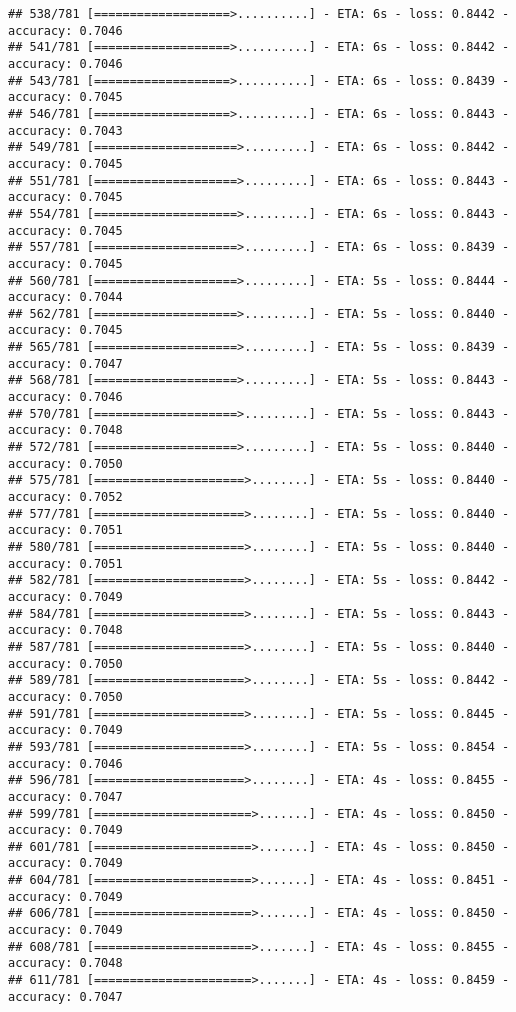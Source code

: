 \documentclass[
]{article}
\begin{document}
\begin{verbatim}
## 538/781 [===================>..........] - ETA: 6s - loss: 0.8442 - accuracy: 0.7046
## 541/781 [===================>..........] - ETA: 6s - loss: 0.8442 - accuracy: 0.7046
## 543/781 [===================>..........] - ETA: 6s - loss: 0.8439 - accuracy: 0.7045
## 546/781 [===================>..........] - ETA: 6s - loss: 0.8443 - accuracy: 0.7043
## 549/781 [====================>.........] - ETA: 6s - loss: 0.8442 - accuracy: 0.7045
## 551/781 [====================>.........] - ETA: 6s - loss: 0.8443 - accuracy: 0.7045
## 554/781 [====================>.........] - ETA: 6s - loss: 0.8443 - accuracy: 0.7045
## 557/781 [====================>.........] - ETA: 6s - loss: 0.8439 - accuracy: 0.7045
## 560/781 [====================>.........] - ETA: 5s - loss: 0.8444 - accuracy: 0.7044
## 562/781 [====================>.........] - ETA: 5s - loss: 0.8440 - accuracy: 0.7045
## 565/781 [====================>.........] - ETA: 5s - loss: 0.8439 - accuracy: 0.7047
## 568/781 [====================>.........] - ETA: 5s - loss: 0.8443 - accuracy: 0.7046
## 570/781 [====================>.........] - ETA: 5s - loss: 0.8443 - accuracy: 0.7048
## 572/781 [====================>.........] - ETA: 5s - loss: 0.8440 - accuracy: 0.7050
## 575/781 [=====================>........] - ETA: 5s - loss: 0.8440 - accuracy: 0.7052
## 577/781 [=====================>........] - ETA: 5s - loss: 0.8440 - accuracy: 0.7051
## 580/781 [=====================>........] - ETA: 5s - loss: 0.8440 - accuracy: 0.7051
## 582/781 [=====================>........] - ETA: 5s - loss: 0.8442 - accuracy: 0.7049
## 584/781 [=====================>........] - ETA: 5s - loss: 0.8443 - accuracy: 0.7048
## 587/781 [=====================>........] - ETA: 5s - loss: 0.8440 - accuracy: 0.7050
## 589/781 [=====================>........] - ETA: 5s - loss: 0.8442 - accuracy: 0.7050
## 591/781 [=====================>........] - ETA: 5s - loss: 0.8445 - accuracy: 0.7049
## 593/781 [=====================>........] - ETA: 5s - loss: 0.8454 - accuracy: 0.7046
## 596/781 [=====================>........] - ETA: 4s - loss: 0.8455 - accuracy: 0.7047
## 599/781 [======================>.......] - ETA: 4s - loss: 0.8450 - accuracy: 0.7049
## 601/781 [======================>.......] - ETA: 4s - loss: 0.8450 - accuracy: 0.7049
## 604/781 [======================>.......] - ETA: 4s - loss: 0.8451 - accuracy: 0.7049
## 606/781 [======================>.......] - ETA: 4s - loss: 0.8450 - accuracy: 0.7049
## 608/781 [======================>.......] - ETA: 4s - loss: 0.8455 - accuracy: 0.7048
## 611/781 [======================>.......] - ETA: 4s - loss: 0.8459 - accuracy: 0.7047

\end{verbatim}
\end{document}
